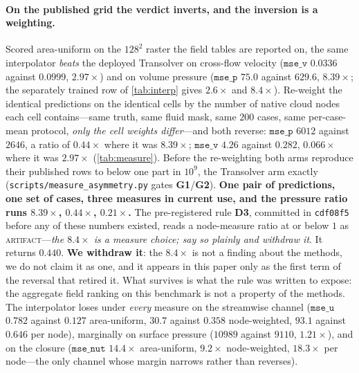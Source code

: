 \paragraph{On the published grid the verdict inverts, and the inversion is a weighting.}
Scored area-uniform on the $128^2$ raster the field tables are reported on, the same
interpolator \emph{beats} the deployed Transolver on cross-flow velocity ($\texttt{mse\_v}$
$0.0336$ against $0.0999$, $2.97\times$) and on volume pressure ($\texttt{mse\_p}$ $75.0$
against $629.6$, $8.39\times$; the separately trained row of \autoref{tab:interp} gives
$2.6\times$ and $8.4\times$). Re-weight the identical predictions on the identical cells
by the number of native cloud nodes each cell contains---same truth, same fluid mask, same
$200$ cases, same per-case-mean protocol, \emph{only the cell weights differ}---and both
reverse: $\texttt{mse\_p}$ $6012$ against $2646$, a ratio of $0.44\times$ where it was
$8.39\times$; $\texttt{mse\_v}$ $4.26$ against $0.282$, $0.066\times$ where it was
$2.97\times$ (\autoref{tab:measure}). Before the re-weighting both arms reproduce their
published rows to below one part in $10^{9}$, the Transolver arm exactly
(\texttt{scripts\slash{}measure\_asymmetry.py} gates \textbf{G1}/\textbf{G2}). \textbf{One pair of
predictions, one set of cases, three measures in current use, and the pressure ratio runs
$8.39\times$, $0.44\times$, $0.21\times$.} The pre-registered rule \textbf{D3}, committed in
\texttt{cdf08f5} before any of these numbers existed, reads a node-measure ratio at or below
$1$ as \textsc{artifact}---\emph{the $8.4\times$ is a measure choice; say so plainly and
withdraw it}. It returns $0.440$. \textbf{We withdraw it}: the $8.4\times$ is not a finding
about the methods, we do not claim it as one, and it appears in this paper only as the first
term of the reversal that retired it. What survives is what the rule was written to expose:
the aggregate field ranking on this benchmark is not a property of the methods. The interpolator loses under
\emph{every} measure on the streamwise channel ($\texttt{mse\_u}$ $0.782$ against $0.127$
area-uniform, $30.7$ against $0.358$ node-weighted, $93.1$ against $0.646$ per node),
marginally on surface pressure ($10989$ against $9110$, $1.21\times$), and on the closure
($\texttt{mse\_nut}$ $14.4\times$ area-uniform, $9.2\times$ node-weighted, $18.3\times$ per
node---the only channel whose margin narrows rather than reverses).

